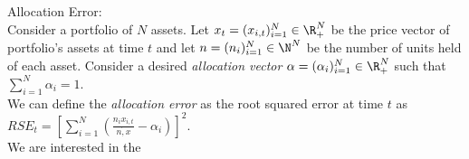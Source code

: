 Allocation Error:\\
Consider a portfolio of $N$ assets.  Let $x_t=(x_{i,t})_{i=1}^N\in\R^N_+$ be the price vector of portfolio's assets at time $t$ and let $n=(n_i)_{i=1}^N\in\N^N$ be the number of units held of each asset.  Consider a desired \emph{allocation vector} $\alpha=(\alpha_i)_{i=1}^N\in\R^N_+$ such that $\sum\limits_{i=1}^N \alpha_i = 1$.\\
We can define the \emph{allocation error} as the root squared error at time $t$ as $RSE_t=\left[\sum\limits_{i=1}^N \left( \frac{n_ix_{i,t}}{\dot{n,x}} - \alpha_i \right) \right]^2$.\\
We are interested in the 